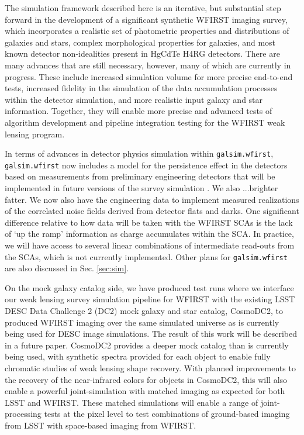 \documentclass[aps,prd, amsmath,amssymb,superscriptaddress,showkeys,nofootinbib,reprint,preprintnumbers]{revtex4-1}
\begin{document}
The simulation framework described here is an iterative, but substantial step forward in the development of a significant synthetic WFIRST imaging survey, which incorporates a realistic set of photometric properties and distributions of galaxies and stars, complex morphological properties for galaxies, and most known detector non-idealities present in HgCdTe H4RG detectors. There are many advances that are still necessary, however, many of which are currently in progress. These include increased simulation volume for more precise end-to-end tests, increased fidelity in the simulation of the data accumulation processes within the detector simulation, and more realistic input galaxy and star information. Together, they will enable more precise and advanced tests of algorithm development and pipeline integration testing for the WFIRST weak lensing program.

In terms of advances in detector physics simulation within \texttt{galsim.wfirst}, \texttt{galsim.wfirst} now includes a model for the persistence effect in the detectors based on measurements from preliminary engineering detectors that will be implemented in future versions of the survey simulation \cite{}. We also ...brighter fatter.  We now also have the engineering data to implement measured realizations of the correlated noise fields derived from detector flats and darks. One significant difference relative to how data will be taken with the WFIRST SCAs is the lack of `up the ramp' information as charge accumulates within the SCA. In practice, we will have access to several linear combinations of intermediate read-outs from the SCAs, which is not currently implemented. Other plans for \texttt{galsim.wfirst} are also discussed in Sec. \ref{sec:sim}.

On the mock galaxy catalog side, we have produced test runs where we interface our weak lensing survey simulation pipeline for WFIRST with the existing LSST DESC Data Challenge 2 (DC2) mock galaxy and star catalog, CosmoDC2, to produced WFIRST imaging over the same simulated universe as is currently being used for DESC image simulations. The result of this work will be described in a future paper. CosmoDC2 provides a deeper mock catalog than is currently being used, with synthetic spectra provided for each object to enable fully chromatic studies of weak lensing shape recovery. With planned improvements to the recovery of the near-infrared colors for objects in CosmoDC2, this will also enable a powerful joint-simulation with matched imaging as expected for both LSST and WFIRST. These matched simulations will enable a range of joint-processing tests at the pixel level to test combinations of ground-based imaging from LSST with space-based imaging from WFIRST.
\end{document}
